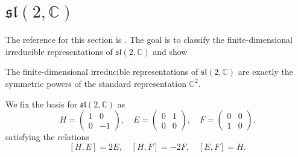 \documentclass{report}
\begin{document}
\section{$\mathfrak{sl}(2, \mathbb C)$}
The reference for this section is \cite[Lecture 11.1]{fulton2013representation}.
The goal is to classify the finite-dimensional irreducible representations of $\mathfrak{sl}(2, \mathbb C)$ and show
\begin{theorem}\label{thm:irreducible_representations_of_sl_2_C}
    The finite-dimensional irreducible representations of $\mathfrak{sl}(2, \mathbb C)$ are exactly the symmetric powers of the standard representation $\mathbb C^2$.
\end{theorem}
We fix the basis for $\mathfrak{sl}(2, \mathbb C)$ as
\[
H = \begin{pmatrix} 1 & 0 \\ 0 & -1 \end{pmatrix}, \quad E = \begin{pmatrix} 0 & 1 \\ 0 & 0 \end{pmatrix}, \quad F = \begin{pmatrix} 0 & 0 \\ 1 & 0 \end{pmatrix}.
\]
satisfying the relations
\[
[H, E] = 2E, \quad [H, F] = -2F, \quad [E, F] = H.
\]
\end{document}
